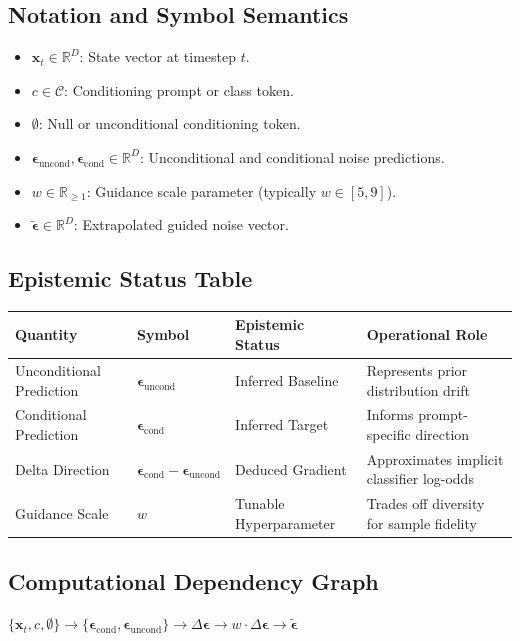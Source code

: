 \documentclass[11pt,a4paper]{article}
\theoremstyle{definition}
\begin{document}
\subsection{Notation and Symbol Semantics}
\begin{itemize}
    \item $\mathbf{x}_t \in \mathbb{R}^D$: State vector at timestep $t$.
    \item $c \in \mathcal{C}$: Conditioning prompt or class token.
    \item $\emptyset$: Null or unconditional conditioning token.
    \item $\boldsymbol{\epsilon}_{\text{uncond}}, \boldsymbol{\epsilon}_{\text{cond}} \in \mathbb{R}^D$: Unconditional and conditional noise predictions.
    \item $w \in \mathbb{R}_{\ge 1}$: Guidance scale parameter (typically $w \in [5, 9]$).
    \item $\tilde{\boldsymbol{\epsilon}} \in \mathbb{R}^D$: Extrapolated guided noise vector.
\end{itemize}

\subsection{Epistemic Status Table}
\begin{table}[h]
\centering
\small
\begin{tabular}{@{}llll@{}}
\toprule
\textbf{Quantity} & \textbf{Symbol} & \textbf{Epistemic Status} & \textbf{Operational Role} \\
\midrule
Unconditional Prediction & $\boldsymbol{\epsilon}_{\text{uncond}}$ & Inferred Baseline & Represents prior distribution drift \\
Conditional Prediction & $\boldsymbol{\epsilon}_{\text{cond}}$ & Inferred Target & Informs prompt-specific direction \\
Delta Direction & $\boldsymbol{\epsilon}_{\text{cond}} - \boldsymbol{\epsilon}_{\text{uncond}}$ & Deduced Gradient & Approximates implicit classifier log-odds \\
Guidance Scale & $w$ & Tunable Hyperparameter & Trades off diversity for sample fidelity \\
\bottomrule
\end{tabular}
\end{table}

\subsection{Computational Dependency Graph}
{\centering
$\{\mathbf{x}_t, c, \emptyset\} \longrightarrow \{\boldsymbol{\epsilon}_{\text{cond}}, \boldsymbol{\epsilon}_{\text{uncond}}\} \longrightarrow \Delta \boldsymbol{\epsilon} \longrightarrow w \cdot \Delta \boldsymbol{\epsilon} \longrightarrow \tilde{\boldsymbol{\epsilon}}$
\par}
\end{document}

